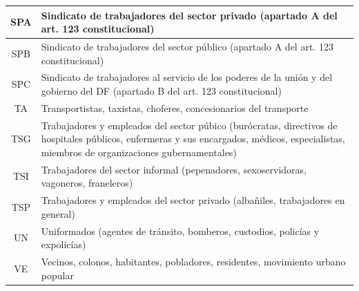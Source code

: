 \documentclass[letterpaper, 11pt]{book}
\theoremstyle{definition}
\theoremstyle{remark}
\begin{document}
{{{{{{{{{{\begin{footnotesize}
\begin{longtable}{|@{ }c|p{14cm}@{ }|}
\hline
SPA & Sindicato de trabajadores del sector privado (apartado A del art. 123 constitucional)\\
\hline
SPB & Sindicato de trabajadores del sector público (apartado A del art. 123 constitucional)\\
\hline
SPC & Sindicato de trabajadores al servicio de los poderes de la unión y del gobierno del DF (apartado B del art. 123 constitucional)\\
\hline
TA & Transportistas, taxistas, choferes, concesionarios del transporte\\
\hline
TSG & Trabajadores y empleados del sector púbico (burócratas, directivos de hospitales públicos, enfermeras y sus encargados, médicos, especialistas, miembros de organizaciones gubernamentales)\\
\hline
TSI & Trabajadores del sector informal (pepenadores, sexoservidoras, vagoneros, franeleros)\\
\hline
TSP & Trabajadores y empleados del sector privado (albañiles, trabajadores en general)\\
\hline
UN & Uniformados (agentes de tránsito, bomberos, custodios, policías y expolicías)\\
\hline
VE & Vecinos, colonos, habitantes, pobladores, residentes, movimiento urbano popular\\
\hline
\end{longtable}
\end{footnotesize}
\newpage





}}}}}}}}}}
\end{document}
